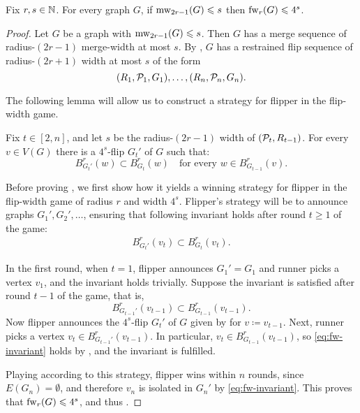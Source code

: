 \begin{lemma}\label{lem:fw}
    Fix $r,s\in\N$. 
    For every graph $G$, if $\mw_{2r-1}(G)\le s$ then  $\fw_r(G)\le 4^s$. 
\end{lemma}

\begin{proof}
    Let $G$ be a graph with $\mw_{2r-1}(G)\le s$. Then $G$ has a merge sequence of radius-$(2r-1)$ merge-width at most $s$.
    By , $G$ has a 
 restrained flip sequence of radius-$(2r+1)$ width at most \(s\) of the form
$$(R_1,\cal P_1,G_1),\ldots,(R_n,\cal P_n,G_n).$$

The following lemma will allow us to construct a strategy for flipper in the flip-width game.

\begin{lemma}\label{lem:strategy}
    Fix $t\in [2,n]$, and 
    let $s$ be the radius-$(2r-1)$ width of $(\cal P_t,R_{t-1})$.
    For every $v\in V(G)$ there is a $4^s$-flip $G_t'$ of $G$ such that:
$$B^r_{G_t'}(w)\subset B^r_{G_t}(w)\quad\text{for every $w\in B^r_{G_{t-1}}(v)$.}$$
\end{lemma}
Before proving , we first show how it yields a winning strategy
for flipper in the flip-width game of radius $r$
    and width $4^s$.
Flipper's strategy will be to announce graphs $G_1',G_2',\ldots$, ensuring  that following invariant holds after round $t\ge 1$ of the game:
    \begin{align}\label{eq:fw-invariant}
    B^r_{G_{t}'}(v_t)\subset B^r_{G_t}(v_t).    
    \end{align}
    
    In the first round, when $t=1$, flipper announces $G_1'=G_1$ and runner picks a vertex 
    $v_1$,
    and the invariant holds trivially.
    Suppose the invariant is satisfied after round $t-1$ of the game,
    that is, 
    $$B^r_{G_{t-1}'}(v_{t-1})\subset B^r_{G_{t-1}}(v_{t-1}).$$
    Now flipper announces the $4^s$-flip $G_t'$ of $G$
    given by  for $v \coloneqq v_{t-1}$.
    Next, runner picks a vertex $v_t\in B^r_{G_{t-1}'}(v_{t-1})$.
In particular, $v_t\in B^r_{G_{t-1}}(v_{t-1})$, so 
 \eqref{eq:fw-invariant} holds by , and the invariant is fulfilled.

    Playing according to this strategy, flipper wins within $n$ rounds,
    since $E(G_n)=\emptyset$, and therefore $v_n$ is isolated in $G_n'$
    by \eqref{eq:fw-invariant}. This proves that $\fw_r(G)\le 4^s$, and thus .
\end{proof}

